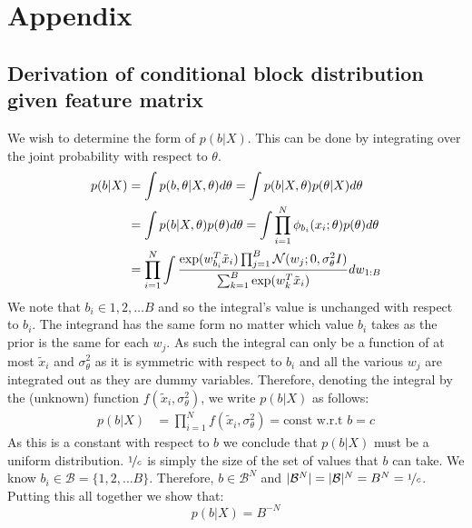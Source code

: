 \section{Appendix}

\subsection{Derivation of conditional block distribution given feature matrix}
\label{appdx:b|x}

We wish to determine the form of $p(b| X)$. This can be done by integrating over the joint probability with respect to $\theta$.
%
\begin{align*}
	p(b | X) &= \int p(b , \theta| X, \theta) d\theta = \int p(b | X, \theta) p(\theta | X) d\theta \\
	&=\int p(b | X, \theta) p(\theta) d\theta = \int \prod_{i=1}^{N} \phi_{b_i}(x_i; \theta) p(\theta) d\theta \\
	&= \prod_{i=1}^{N} \int \frac{\exp(w_{b_i}^T \tilde{x}_i) \prod_{j=1}^{B} \mathcal{N}(w_j; 0, \sigma_\theta^2 I)}{\sum_{k=1}^{B} \exp(w_{k}^T \tilde{x}_i)} dw_{1:B}
\end{align*}
%
We note that $b_i \in {1, 2, \dots B}$ and so the integral's value is unchanged with respect to $b_i$. The integrand has the same form no matter which value $b_i$ takes as the prior is the same for each $w_j$. As such the integral can only be a function of at most $\tilde{x}_i$ and $\sigma_\theta^2$ as it is symmetric with respect to $b_i$ and all the various $w_j$ are integrated out as they are dummy variables. Therefore, denoting the integral by the (unknown) function $f(\tilde{x}_i, \sigma_\theta^2)$, we write $p(b| X)$ as follows:
%
\begin{align*}
	p(b | X) &= \prod_{i=1}^{N} f(\tilde{x}_i, \sigma_\theta^2) = \textrm{const w.r.t } b = c
\end{align*}
%
As this is a constant with respect to $b$ we conclude that $p(b | X)$ must be a uniform distribution. $\nicefrac{1}{c}$ is simply the size of the set of values that $b$ can take. We know $b_i \in \mathcal{B} = \{1, 2, \dots B\}$. Therefore, $b \in \mathcal{B}^N$ and $|\mathcal{B}^N| = |\mathcal{B}|^N = B^N= \nicefrac{1}{c}$. Putting this all together we show that:
%
\begin{equation}
	p(b | X) = B^{-N}
\end{equation}

